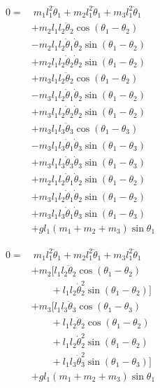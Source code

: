 \documentclass[11pt,a4paper]{article}
\begin{document}
\begin{align*}
  0 =& \ m_1 l_1^2 \ddot{\theta}_1 + m_2 l_1^2 \ddot{\theta}_1 + m_3 l_1^2 \ddot{\theta}_1 \\
     &+ m_2 l_1 l_2 \ddot{\theta}_2 \cos(\theta_1 - \theta_2) \\
     &- m_2 l_1 l_2 \dot{\theta}_1\dot{\theta}_2 \sin(\theta_1 - \theta_2) \\
     &+ m_2 l_1 l_2 \dot{\theta}_2\dot{\theta}_2 \sin(\theta_1 - \theta_2) \\
     &+ m_3 l_1 l_2 \ddot{\theta}_2 \cos(\theta_1 - \theta_2) \\
     &- m_3 l_1 l_2 \dot{\theta}_1 \dot{\theta}_2 \sin(\theta_1 - \theta_2) \\
     &+ m_3 l_1 l_2 \dot{\theta}_2 \dot{\theta}_2 \sin(\theta_1 - \theta_2) \\
     &+ m_3 l_1 l_3 \ddot{\theta}_3 \cos(\theta_1 - \theta_3) \\
     &- m_3 l_1 l_3 \dot{\theta}_1 \dot{\theta}_3 \sin(\theta_1 - \theta_3) \\
     &+ m_3 l_1 l_3 \dot{\theta}_3 \dot{\theta}_3 \sin(\theta_1 - \theta_3) \\
     &+ m_2 l_1 l_2 \dot{\theta}_1 \dot{\theta}_2 \sin(\theta_1 - \theta_2) \\
     &+ m_3 l_1 l_2 \dot{\theta}_1 \dot{\theta}_2 \sin(\theta_1 - \theta_2) \\
     &+ m_3 l_1 l_3 \dot{\theta}_1 \dot{\theta}_3 \sin(\theta_1 - \theta_3) \\
     &+ g l_1 (m_1 + m_2 + m_3) \sin\theta_1
\end{align*}

\begin{align*}
  0 =& \ m_1 l_1^2 \ddot{\theta}_1 + m_2 l_1^2 \ddot{\theta}_1 + m_3 l_1^2 \ddot{\theta}_1 \\
     &+ m_2 \Big[ l_1 l_2 \ddot{\theta}_2 \cos(\theta_1 - \theta_2) \\
     &\qquad+ l_1 l_2 \dot{\theta}_2^2 \sin(\theta_1 - \theta_2) \Big] \\
     &+ m_3 \Big[ l_1 l_3 \ddot{\theta}_3 \cos(\theta_1 - \theta_3) \\
     &\qquad+ l_1 l_2 \ddot{\theta}_2 \cos(\theta_1 - \theta_2) \\
     &\qquad+ l_1 l_2 \dot{\theta}_2^2 \sin(\theta_1 - \theta_2) \\
     &\qquad+ l_1 l_3 \dot{\theta}_3^2 \sin(\theta_1 - \theta_3) \Big] \\
     &+ g l_1 (m_1 + m_2 + m_3) \sin\theta_1
\end{align*}
\end{document}
